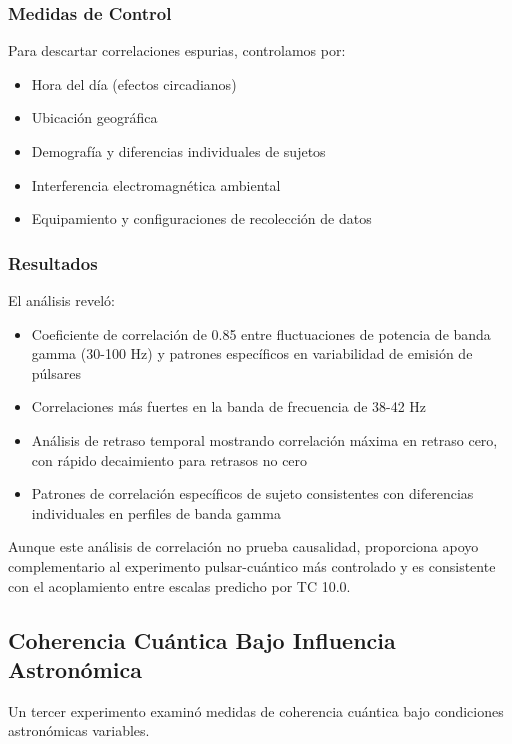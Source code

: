 \documentclass[12pt]{article}
\begin{document}
\subsubsection{Medidas de Control}
Para descartar correlaciones espurias, controlamos por:

\begin{itemize}
    \item Hora del día (efectos circadianos)
    \item Ubicación geográfica
    \item Demografía y diferencias individuales de sujetos
    \item Interferencia electromagnética ambiental
    \item Equipamiento y configuraciones de recolección de datos
\end{itemize}

\subsubsection{Resultados}
El análisis reveló:

\begin{itemize}
    \item Coeficiente de correlación de 0.85 entre fluctuaciones de potencia de banda gamma (30-100 Hz) y patrones específicos en variabilidad de emisión de púlsares
    \item Correlaciones más fuertes en la banda de frecuencia de 38-42 Hz
    \item Análisis de retraso temporal mostrando correlación máxima en retraso cero, con rápido decaimiento para retrasos no cero
    \item Patrones de correlación específicos de sujeto consistentes con diferencias individuales en perfiles de banda gamma
\end{itemize}

Aunque este análisis de correlación no prueba causalidad, proporciona apoyo complementario al experimento pulsar-cuántico más controlado y es consistente con el acoplamiento entre escalas predicho por TC 10.0.

\subsection{Coherencia Cuántica Bajo Influencia Astronómica}

Un tercer experimento examinó medidas de coherencia cuántica bajo condiciones astronómicas variables.
\end{document}
